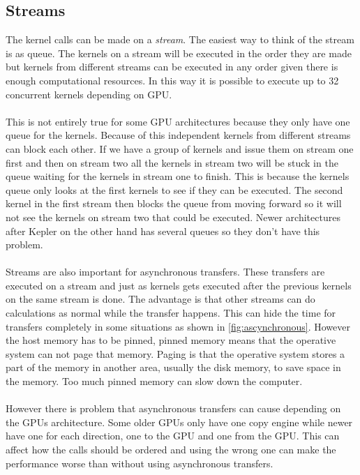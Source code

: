 \documentclass[10pt,a4paper]{report}
\begin{document}
\subsection{Streams}
\label{streams}
The kernel calls can be made on a \emph{stream}. The easiest way to think of the stream is as queue. The kernels on a stream will be executed in the order they are made but kernels from different streams can be executed in any order given there is enough computational resources. In this way it is possible to execute up to 32 concurrent kernels depending on GPU.\cite{cuda}\\
\\
This is not entirely true for some GPU architectures because they only have one queue for the kernels. Because of this independent kernels from different streams can block each other. If we have a group of kernels and issue them on stream one first and then on stream two all the kernels in stream two will be stuck in the queue waiting for the kernels in stream one to finish. This is because the kernels queue only looks at the first kernels to see if they can be executed. The second kernel in the first stream then blocks the queue from moving forward so it will not see the kernels on stream two that could be executed. Newer architectures after Kepler on the other hand has several queues so they don't have this problem.\cite{cuda, cuda_best_practice, kepler_tuning_guide}\\
\\
Streams are also important for asynchronous transfers. These transfers are executed on a stream and just as kernels gets executed after the previous kernels on the same stream is done. The advantage is that other streams can do calculations as normal while the transfer happens. This can hide the time for transfers completely in some situations as shown in \ref{fig:ascynchronous}. However the host memory has to be pinned, pinned memory means that the operative system can not page that memory. Paging is that the operative system stores a part of the memory in another area, usually the disk memory, to save space in the memory. Too much pinned memory can slow down the computer.\cite{cuda, overlap_transfers_cuda}\\
\\
However there is problem that asynchronous transfers can cause depending on the GPUs architecture\cite{overlap_transfers_cuda, cuda_fortran_overlap}. Some older GPUs only have one copy engine while newer have one for each direction, one to the GPU and one from the GPU\cite{overlap_transfers_cuda, cuda_fortran_overlap}. This can affect how the calls should be ordered and using the wrong one can make the performance worse than without using asynchronous transfers\cite{overlap_transfers_cuda, cuda_fortran_overlap}.
\end{document}
